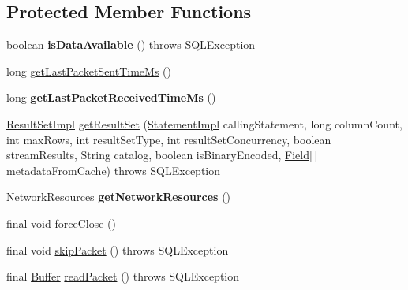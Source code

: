\subsection*{Protected Member Functions}
\begin{DoxyCompactItemize}
\item 
\mbox{\label{classcom_1_1mysql_1_1jdbc_1_1_mysql_i_o_a488f63df6fbee68f43c10ef5ea139977}} 
boolean {\bfseries is\+Data\+Available} ()  throws S\+Q\+L\+Exception 
\item 
long \mbox{\hyperlink{classcom_1_1mysql_1_1jdbc_1_1_mysql_i_o_aa095242c04541a0fd380446e67d765d8}{get\+Last\+Packet\+Sent\+Time\+Ms}} ()
\item 
\mbox{\label{classcom_1_1mysql_1_1jdbc_1_1_mysql_i_o_a6d74cc4256f4851c4dbc96469e80fc4c}} 
long {\bfseries get\+Last\+Packet\+Received\+Time\+Ms} ()
\item 
\mbox{\hyperlink{classcom_1_1mysql_1_1jdbc_1_1_result_set_impl}{Result\+Set\+Impl}} \mbox{\hyperlink{classcom_1_1mysql_1_1jdbc_1_1_mysql_i_o_a73c871988cf4c69bf78db472e6a7713f}{get\+Result\+Set}} (\mbox{\hyperlink{classcom_1_1mysql_1_1jdbc_1_1_statement_impl}{Statement\+Impl}} calling\+Statement, long column\+Count, int max\+Rows, int result\+Set\+Type, int result\+Set\+Concurrency, boolean stream\+Results, String catalog, boolean is\+Binary\+Encoded, \mbox{\hyperlink{classcom_1_1mysql_1_1jdbc_1_1_field}{Field}}\mbox{[}$\,$\mbox{]} metadata\+From\+Cache)  throws S\+Q\+L\+Exception 
\item 
\mbox{\label{classcom_1_1mysql_1_1jdbc_1_1_mysql_i_o_ae030add0abfc9799fa23d7b5ab982d97}} 
Network\+Resources {\bfseries get\+Network\+Resources} ()
\item 
final void \mbox{\hyperlink{classcom_1_1mysql_1_1jdbc_1_1_mysql_i_o_a35b3e85f82755ba047023c6094ab5cd6}{force\+Close}} ()
\item 
final void \mbox{\hyperlink{classcom_1_1mysql_1_1jdbc_1_1_mysql_i_o_a9b5ceba1f2420b68450dd1f8ae9ad53a}{skip\+Packet}} ()  throws S\+Q\+L\+Exception 
\item 
final \mbox{\hyperlink{classcom_1_1mysql_1_1jdbc_1_1_buffer}{Buffer}} \mbox{\hyperlink{classcom_1_1mysql_1_1jdbc_1_1_mysql_i_o_a97388b336bdd49fcbf3ee8f1e305e11a}{read\+Packet}} ()  throws S\+Q\+L\+Exception 
\item 

\end{DoxyCompactItemize}
